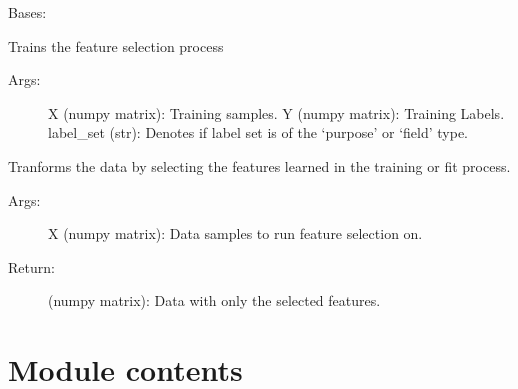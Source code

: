 \documentclass[letterpaper,10pt,english]{sphinxmanual}
\begin{document}
\begin{fulllineitems}
\label{\detokenize{KUHERD:KUHERD.MultiFeatureSelector.MultiFeatureSelector}}
Bases: 

\begin{fulllineitems}
\label{\detokenize{KUHERD:KUHERD.MultiFeatureSelector.MultiFeatureSelector.fit}}
Trains the feature selection process
\begin{description}
\item[{Args:}] \leavevmode
X (numpy matrix): Training samples.
Y (numpy matrix): Training Labels.
label\_set (str): Denotes if label set is of the `purpose' or `field' type.

\end{description}

\end{fulllineitems}


\begin{fulllineitems}
\label{\detokenize{KUHERD:KUHERD.MultiFeatureSelector.MultiFeatureSelector.transform}}
Tranforms the data by selecting the features learned in the training or \sphinxquotedblleft{}fit\sphinxquotedblright{} process.
\begin{description}
\item[{Args:}] \leavevmode
X (numpy matrix): Data samples to run feature selection on.

\item[{Return:}] \leavevmode
(numpy matrix): Data with only the selected features.

\end{description}

\end{fulllineitems}


\end{fulllineitems}



\section{Module contents}
\label{\detokenize{KUHERD:module-KUHERD}}\label{\detokenize{KUHERD:module-contents}}
\end{document}
